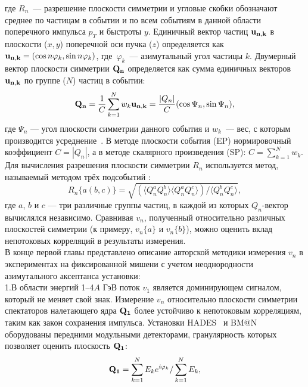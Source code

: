 где $R_n$~--- разрешение плоскости симметрии и угловые скобки обозначают среднее по  частицам в событии и по всем событиям
в данной области поперечного импульса $p_T$ и быстроты $y$. Единичный вектор частиц $\bf{u_{n,k}}$
в плоскости ($x,y$)  поперечной оси пучка ($z$) определяется как  ${\bf u_{n,k}} = ( \cos n\varphi_k, \sin n\varphi_k )$, где~$\varphi_k$~---
азимутальный угол  частицы $k$. Двумерный вектор плоскости симметрии ${\bf Q_n}$ определяется
как сумма единичных векторов  $\bf{u_{n,k}}$ по группе ($N$) частиц в событии:
\begin{equation}
   {\bf Q_n} = \frac{1}{C} \sum_{k=1}^{N} w_k {\bf u_{n,k}} = \frac{|Q_n|}{C} (\cos{\Psi_n}, \sin{\Psi_n}) ,
\end{equation}
где $\Psi_n$ --- угол плоскости симметрии данного события и  $w_k$~--- вес, с которым производится усреднение~\cite{Voloshin:2008dg,Selyuzhenkov:2007zi}.
В методе плоскости события (EP) нормировочный коэффициент $C=|Q_n|$, а в методе  скалярного произведения (SP):  $C=\sum_{k=1}^N w_k$. 
Для вычисления разрешения плоскости симметрии $R_n$  используется метод, называемый методом трёх подсобытий \cite{Voloshin:2008dg,Selyuzhenkov:2007zi}:
\begin{equation}
  R_n\{a(b,c)\}  =  \sqrt { (\langle Q_n^a Q_n^b \rangle \langle Q_n^a Q_n^c \rangle) / \langle Q_n^b Q_n^c \rangle },
\label{3sub}
\end{equation}
где $a$, $b$ и $c$ --- три различные группы частиц, в каждой из которых $Q_n$-вектор вычислялся независимо.
Сравнивая $v_n$, полученный относительно различных плоскостей симметрии (к примеру, $v_n\{a\}$ и $v_n\{b\}$), можно оценить вклад непотоковых
корреляций в результаты измерения. \\
В конце первой  главы представлено описание авторской методики измерения $v_n$ в экспериментах
на фиксированной мишени с учетом неоднородности азимутального аксептанса установки:\\
1.\;В области энергий 1--4$A$ ГэВ  поток $v_1$ является доминирующем сигналом, который не меняет свой знак.
 Измерение $v_n$  относительно плоскости симметрии спектаторов налетающего ядра ${\bf Q_1}$  более устойчиво к
 непотоковым корреляциям, таким как закон сохранения импульса. Установки HADES~\cite{HADES:2009aat} и BM@N~\cite{bmn} оборудованы передними модульными детекторами,
 гранулярность которых позволяет оценить плоскость  ${\bf Q_1}$:
\begin{equation}
{\bf Q_1} = \sum_{k=1}^{N} E_k e^{i\varphi_k} / \sum_{k=1}^{N} E_k,
\label{modul}
\end{equation}
